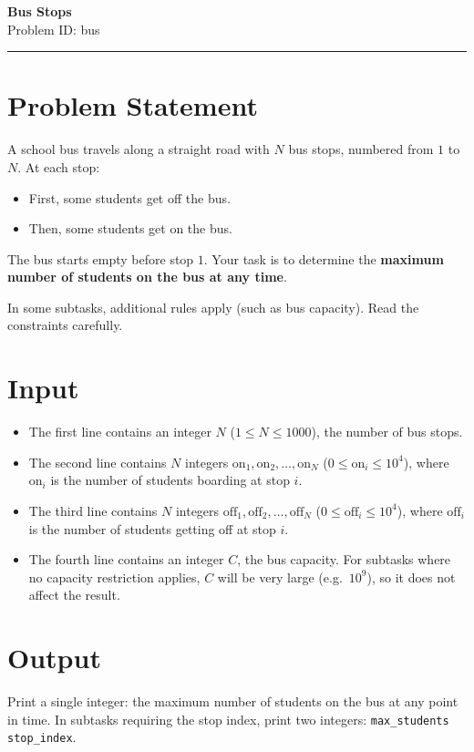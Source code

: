 \documentclass[12pt,a4paper]{article}
\begin{document}
\begin{center}
    {\LARGE \textbf{Bus Stops}} \\[0.5em]
    {Problem ID: bus} \\[1em]
    \rule{\textwidth}{0.4pt}
\end{center}

\vspace{1em}

\section*{Problem Statement}
A school bus travels along a straight road with $N$ bus stops, numbered from $1$ to $N$.  
At each stop:
\begin{itemize}
    \item First, some students get off the bus.  
    \item Then, some students get on the bus.  
\end{itemize}

The bus starts empty before stop $1$. Your task is to determine the \textbf{maximum number of students on the bus at any time}.

In some subtasks, additional rules apply (such as bus capacity). Read the constraints carefully.

\section*{Input}
\begin{itemize}
    \item The first line contains an integer $N$ ($1 \leq N \leq 1000$), the number of bus stops.  
    \item The second line contains $N$ integers $\text{on}_1, \text{on}_2, \ldots, \text{on}_N$ ($0 \leq \text{on}_i \leq 10^4$),  
    where $\text{on}_i$ is the number of students boarding at stop $i$.  
    \item The third line contains $N$ integers $\text{off}_1, \text{off}_2, \ldots, \text{off}_N$ ($0 \leq \text{off}_i \leq 10^4$),  
    where $\text{off}_i$ is the number of students getting off at stop $i$.  
    \item The fourth line contains an integer $C$, the bus capacity.  
    For subtasks where no capacity restriction applies, $C$ will be very large (e.g.\ $10^9$), so it does not affect the result.  
\end{itemize}

\section*{Output}
Print a single integer: the maximum number of students on the bus at any point in time.  
In subtasks requiring the stop index, print two integers:  
\texttt{max\_students stop\_index}.
\end{document}
